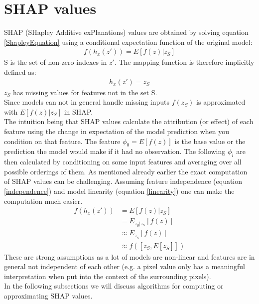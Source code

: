 \documentclass[conference]{IEEEtran}
\begin{document}
\section{SHAP values}
\label{SHAP}
SHAP (SHapley Additive exPlanations) values \cite{b2} are obtained by solving equation \ref{ShapleyEquation} using a conditional expectation function of the original model:
\begin{align}
f(h_x(z')) = E[f(z) | z_S]
\end{align}
S is the set of non-zero indexes in $z'$. 
The mapping function is therefore implicitly defined as:\\
\begin{align}
h_x(z') = z_S
\end{align}
$z_S$ has missing values for features not in the set S.\\
Since models can not in general handle missing inputs $f(z_S)$ is approximated with $E[f(z)| z_S]$ in SHAP.\\
The intuition being that SHAP values  calculate the attribution (or effect) of each feature using the change in expectation of the model prediction when you condition on that feature. 
The feature $\phi_0 = E[f(z)]$ is the base value or the prediction the model would make if it had no observation. 
The following $\phi_i$ are then calculated by conditioning on some input features and averaging over all possible orderings of them.
As mentioned already earlier the exact computation of SHAP values can be challenging. 
Assuming feature independence (equation \ref{independence}) and model linearity (equation \ref{linearity}) one can make the computation much easier. 
\begin{align}
f(h_x(z')) &= E[f(z)|z_{S}]\\
&= E_{z_{\overline{S}}|z_S}[f(z)]\\
&\approx E_{z_{\overline{S}}}[f(z)] \label{independence}\\ 
&\approx f([z_S, E[z_{\overline{S}}]])  \label{linearity}
\end{align}
These are strong assumptions as a lot of models are non-linear and features are in general not independent of each other (e.g. a pixel value only has a meaningful interpretation when put into the context of the surrounding pixels).\\
In the following subsections we will discuss algorithms for computing or approximating SHAP values.
\end{document}
